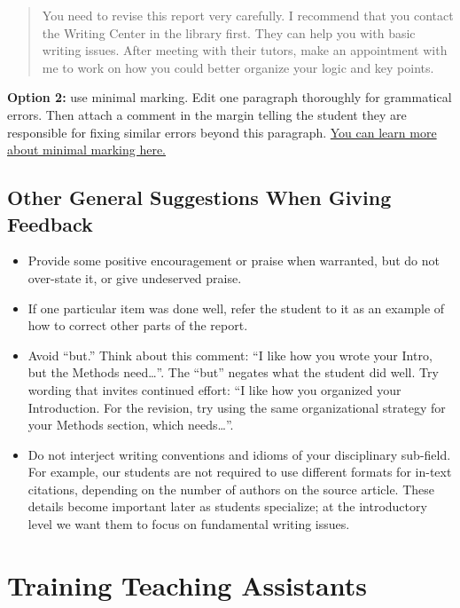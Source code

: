 \documentclass[
]{book}
\providecommand{\tightlist}{%
  \setlength{\itemsep}{0pt}\setlength{\parskip}{0pt}}
\begin{document}
\begin{quote}
You need to revise this report very carefully. I recommend that you contact the Writing Center in the library first. They can help you with basic writing issues. After meeting with their tutors, make an appointment with me to work on how you could better organize your logic and key points.
\end{quote}

\textbf{Option 2:} use minimal marking. Edit one paragraph thoroughly for grammatical errors. Then attach a comment in the margin telling the student they are responsible for fixing similar errors beyond this paragraph. \href{www.csuchico.edu/ge/faculty/writing_intensive_u/responding_to_writing/responding_to_surface_errors.shtml}{You can learn more about minimal marking here.}

\hypertarget{other-general-suggestions-when-giving-feedback}{%
\section{Other General Suggestions When Giving Feedback}\label{other-general-suggestions-when-giving-feedback}}

\begin{itemize}
\tightlist
\item
  Provide some positive encouragement or praise when warranted, but do not over-state it, or give undeserved praise.
\item
  If one particular item was done well, refer the student to it as an example of how to correct other parts of the report.
\item
  Avoid ``but.'' Think about this comment: ``I like how you wrote your Intro, but the Methods need\ldots{}''. The ``but'' negates what the student did well. Try wording that invites continued effort: ``I like how you organized your Introduction. For the revision, try using the same organizational strategy for your Methods section, which needs\ldots{}''.
\item
  Do not interject writing conventions and idioms of your disciplinary sub-field. For example, our students are not required to use different formats for in-text citations, depending on the number of authors on the source article. These details become important later as students specialize; at the introductory level we want them to focus on fundamental writing issues.
\end{itemize}

\hypertarget{tatraining720}{%
\chapter{Training Teaching Assistants}\label{tatraining720}}
\end{document}
